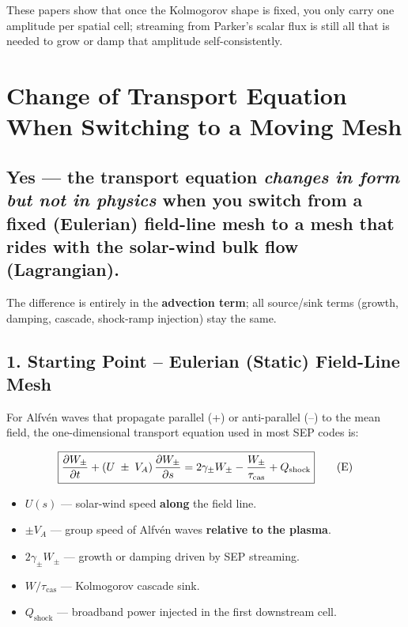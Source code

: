 \bigskip

\noindent These papers show that once the Kolmogorov shape is fixed, you only carry one amplitude per spatial cell; streaming from Parker’s scalar flux is still all that is needed to grow or damp that amplitude self-consistently.


\section*{Change of Transport Equation When Switching to a Moving Mesh}

\subsection*{Yes — the transport equation \emph{changes in form but not in physics} when you switch from a fixed (Eulerian) field-line mesh to a mesh that rides with the solar-wind bulk flow (Lagrangian).}

The difference is entirely in the \textbf{advection term}; all source/sink terms (growth, damping, cascade, shock‐ramp injection) stay the same.

\subsection*{1. Starting Point – Eulerian (Static) Field-Line Mesh}

For Alfvén waves that propagate parallel (+) or anti-parallel (–) to the mean field, the one-dimensional transport equation used in most SEP codes is:

\begin{equation}
\boxed{%
\frac{\partial W_\pm}{\partial t}
+\left(U\;\pm\;V_A\right)\frac{\partial W_\pm}{\partial s}
=2\gamma_\pm W_\pm
-\frac{W_\pm}{\tau_{\rm cas}}
+Q_{\text{shock}} } \tag{E}
\end{equation}

\begin{itemize}
\item $U(s)$ — solar-wind speed \textbf{along} the field line.
\item $\pm V_A$ — group speed of Alfvén waves \textbf{relative to the plasma}.
\item $2\gamma_\pm W_\pm$ — growth or damping driven by SEP streaming.
\item $W/\tau_{\text{cas}}$ — Kolmogorov cascade sink.
\item $Q_{\text{shock}}$ — broadband power injected in the first downstream cell.
\end{itemize}

